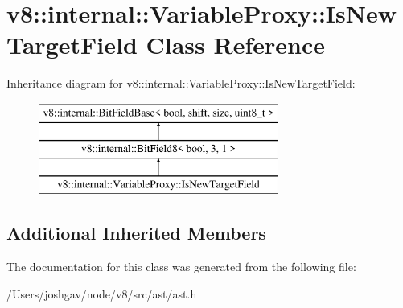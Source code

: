 \hypertarget{classv8_1_1internal_1_1_variable_proxy_1_1_is_new_target_field}{}\section{v8\+:\+:internal\+:\+:Variable\+Proxy\+:\+:Is\+New\+Target\+Field Class Reference}
\label{classv8_1_1internal_1_1_variable_proxy_1_1_is_new_target_field}
Inheritance diagram for v8\+:\+:internal\+:\+:Variable\+Proxy\+:\+:Is\+New\+Target\+Field\+:\begin{figure}[H]
\begin{center}
\leavevmode
\includegraphics[height=3.000000cm]{classv8_1_1internal_1_1_variable_proxy_1_1_is_new_target_field}
\end{center}
\end{figure}
\subsection*{Additional Inherited Members}


The documentation for this class was generated from the following file\+:\begin{DoxyCompactItemize}
\item 
/\+Users/joshgav/node/v8/src/ast/ast.\+h\end{DoxyCompactItemize}
